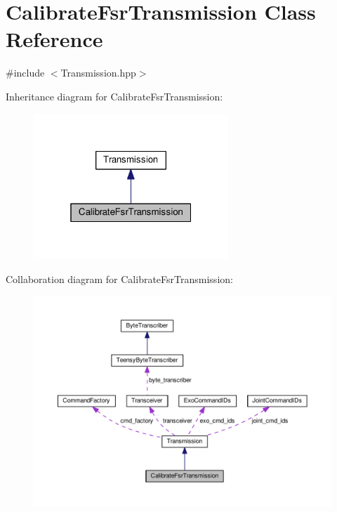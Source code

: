 \hypertarget{classCalibrateFsrTransmission}{}\section{Calibrate\+Fsr\+Transmission Class Reference}
\label{classCalibrateFsrTransmission}


{\ttfamily \#include $<$Transmission.\+hpp$>$}



Inheritance diagram for Calibrate\+Fsr\+Transmission\+:\nopagebreak
\begin{figure}[H]
\begin{center}
\leavevmode
\includegraphics[width=208pt]{classCalibrateFsrTransmission__inherit__graph}
\end{center}
\end{figure}


Collaboration diagram for Calibrate\+Fsr\+Transmission\+:\nopagebreak
\begin{figure}[H]
\begin{center}
\leavevmode
\includegraphics[width=350pt]{classCalibrateFsrTransmission__coll__graph}
\end{center}
\end{figure}
